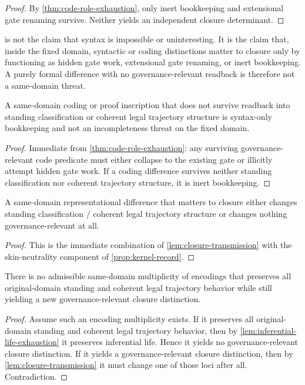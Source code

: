 \begin{proof}
By \cref{thm:code-role-exhaustion}, only inert bookkeeping and extensional gate renaming survive. Neither yields an independent closure determinant.
\end{proof}

\begin{remark}
\label{rem:syntax-compression}
 is not the claim that syntax is impossible or uninteresting. It is the claim that, inside the fixed domain, syntactic or coding distinctions matter to closure only by functioning as hidden gate work, extensional gate renaming, or inert bookkeeping. A purely formal difference with no governance-relevant readback is therefore not a same-domain threat.
\end{remark}

\begin{corollary}\label{cor:bare-syntax}
A same-domain coding or proof inscription that does not survive readback into standing classification or coherent legal trajectory structure is syntax-only bookkeeping and not an incompleteness threat on the fixed domain.
\end{corollary}

\begin{proof}
Immediate from \cref{thm:code-role-exhaustion}: any surviving governance-relevant code predicate must either collapse to the existing gate or illicitly attempt hidden gate work. If a coding difference survives neither standing classification nor coherent trajectory structure, it is inert bookkeeping.
\end{proof}

\begin{lemma}
A same-domain representational difference that matters to closure either changes standing classification / coherent legal trajectory structure or changes nothing governance-relevant at all.
\end{lemma}

\begin{proof}
This is the immediate combination of \cref{lem:closure-transmission} with the skin-neutrality component of \cref{prop:kernel-record}.
\end{proof}

\begin{theorem}
There is no admissible same-domain multiplicity of encodings that preserves all original-domain standing and coherent legal trajectory behavior while still yielding a new governance-relevant closure distinction.
\end{theorem}

\begin{proof}
Assume such an encoding multiplicity exists. If it preserves all original-domain standing and coherent legal trajectory behavior, then by \cref{lem:inferential-life-exhaustion} it preserves inferential life. Hence it yields no governance-relevant closure distinction. If it yields a governance-relevant closure distinction, then by \cref{lem:closure-transmission} it must change one of those loci after all. Contradiction.
\end{proof}
